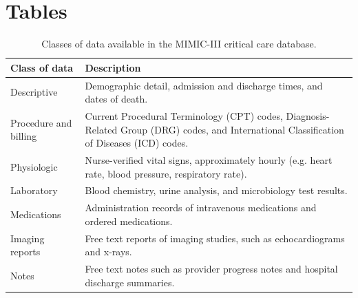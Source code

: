 \documentclass[english]{article}
\begin{document}
\section*{Tables}





\begin{center}
\begin{table}
\begin{tabular}{|l|p{8cm}|}
    \hline
    Class of data & Description \\ 
    \hline
    Descriptive & Demographic detail, admission and discharge times, and dates of death. \\ 
    \hline
    Procedure and billing & Current Procedural Terminology (CPT) codes, Diagnosis-Related Group (DRG) codes, and International Classification of Diseases (ICD) codes. \\ 
    \hline
    Physiologic & Nurse-verified vital signs, approximately hourly (e.g. heart rate, blood pressure, respiratory rate). \\ 
    \hline
    Laboratory & Blood chemistry, urine analysis, and microbiology test results. \\ 
    \hline
    Medications & Administration records of intravenous medications and ordered medications. \\ 
    \hline
    Imaging reports & Free text reports of imaging studies, such as echocardiograms and x-rays. \\ 
    \hline
    Notes & Free text notes such as provider progress notes and hospital discharge summaries. \\ 
    \hline
\end{tabular}
\caption{Classes of data available in the MIMIC-III critical care database.}
\label{table:dataclasses}
\end{table}
\end{center}
\end{document}
